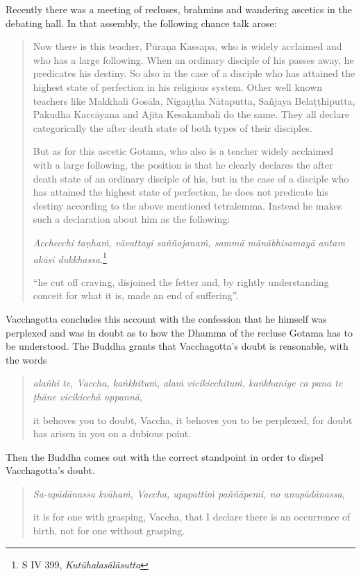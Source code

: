 Recently there was a meeting of recluses, brahmins and wandering ascetics in the debating hall. In that assembly, the following chance talk arose:

\begin{quote}
Now there is this teacher, Pūraṇa Kassapa, who is widely acclaimed and who has a large following. When an ordinary disciple of his passes away, he predicates his destiny. So also in the case of a disciple who has attained the highest state of perfection in his religious system. Other well known teachers like Makkhali Gosāla, Nigaṇṭha Nātaputta, Sañjaya Belaṭṭhiputta, Pakudha Kaccāyana and Ajita Kesakambali do the same. They all declare categorically the after death state of both types of their disciples.

But as for this ascetic Gotama, who also is a teacher widely acclaimed with a large following, the position is that he clearly declares the after death state of an ordinary disciple of his, but in the case of a disciple who has attained the highest state of perfection, he does not predicate his destiny according to the above mentioned tetralemma. Instead he makes such a declaration about him as the following:

\emph{Acchecchi taṇhaṁ, vāvattayi saññojanaṁ, sammā mānābhisamayā antam akāsi dukkhassa},\footnote{S IV 399, \emph{Kutūhalasālāsutta}}

``he cut off craving, disjoined the fetter and, by rightly understanding conceit for what it is, made an end of suffering''.
\end{quote}

Vacchagotta concludes this account with the confession that he himself was perplexed and was in doubt as to how the Dhamma of the recluse Gotama has to be understood. The Buddha grants that Vacchagotta's doubt is reasonable, with the words

\begin{quote}
\emph{alañhi te, Vaccha, kaṅkhituṁ, alaṁ vicikicchituṁ, kaṅkhaniye ca pana te ṭhāne vicikicchā uppannā},

it behoves you to doubt, Vaccha, it behoves you to be perplexed, for doubt has arisen in you on a dubious point.
\end{quote}

Then the Buddha comes out with the correct standpoint in order to dispel Vacchagotta's doubt.

\begin{quote}
\emph{Sa-upādānassa kvāhaṁ, Vaccha, upapattiṁ paññāpemi, no anupādānassa},

it is for one with grasping, Vaccha, that I declare there is an occurrence of birth, not for one without grasping.
\end{quote}

